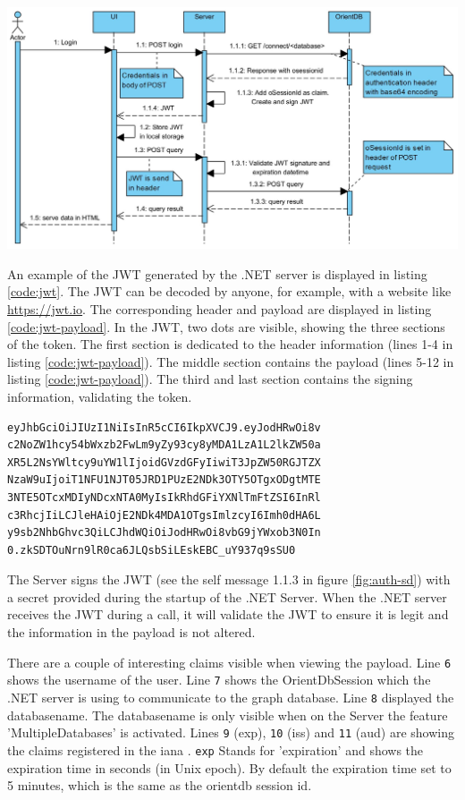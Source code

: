 \begingroup
\captionsetup{type=figure}
\includegraphics[scale=0.4]{thesis/images/authentication-sd.png}
\label{fig:auth-sd}
\endgroup

An example of the JWT generated by the .NET server is displayed in listing \ref{code:jwt}. The JWT can be decoded by anyone, for example, with a website like \url{https://jwt.io}. The corresponding header and payload are displayed in listing \ref{code:jwt-payload}. In the JWT, two dots are visible, showing the three sections of the token. The first section is dedicated to the header information (lines 1-4 in listing \ref{code:jwt-payload}). The middle section contains the payload (lines 5-12 in listing \ref{code:jwt-payload}). The third and last section contains the signing information, validating the token. 

\begin{lstlisting}[language=xml, caption=Example JSON Web Token (line breaks for display purposes only), style=nonrstyle, label=code:jwt]
eyJhbGciOiJIUzI1NiIsInR5cCI6IkpXVCJ9.eyJodHRwOi8v
c2NoZW1hcy54bWxzb2FwLm9yZy93cy8yMDA1LzA1L2lkZW50a
XR5L2NsYWltcy9uYW1lIjoidGVzdGFyIiwiT3JpZW50RGJTZX
NzaW9uIjoiT1NFU1NJT05JRD1PUzE2NDk3OTY5OTgxODgtMTE
3NTE5OTcxMDIyNDcxNTA0MyIsIkRhdGFiYXNlTmFtZSI6InRl
c3RhcjIiLCJleHAiOjE2NDk4MDA1OTgsImlzcyI6Imh0dHA6L
y9sb2NhbGhvc3QiLCJhdWQiOiJodHRwOi8vbG9jYWxob3N0In
0.zkSDTOuNrn9lR0ca6JLQsbSiLEskEBC_uY937q9sSU0
\end{lstlisting}

The Server signs the JWT (see the self message 1.1.3 in figure \ref{fig:auth-sd}) with a secret provided during the startup of the .NET Server. When the .NET server receives the JWT during a call, it will validate the JWT to ensure it is legit and the information in the payload is not altered.  

There are a couple of interesting claims visible when viewing the payload. Line \verb|6| shows the username of the user. Line \verb|7| shows the OrientDbSession which the .NET server is using to communicate to the graph database. Line \verb|8| displayed the databasename. The databasename is only visible when on the Server the feature 'MultipleDatabases' is activated. Lines \verb|9| (exp), \verb|10| (iss) and \verb|11| (aud) are showing the claims registered in the \acrfull{iana} \cite{jones2015json}. \verb|exp| Stands for 'expiration' and shows the expiration time in seconds (in Unix epoch). By default the expiration time set to 5 minutes, which is the same as the orientdb session id. 

